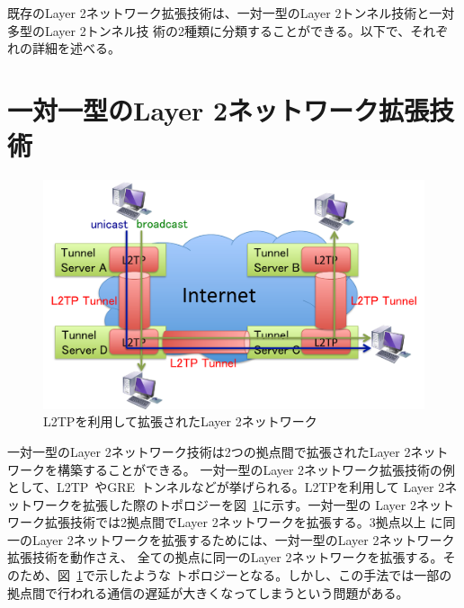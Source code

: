 既存のLayer 2ネットワーク拡張技術は、一対一型のLayer 2トンネル技術と一対多型のLayer 2トンネル技
術の2種類に分類することができる。以下で、それぞれの詳細を述べる。

\section{一対一型のLayer 2ネットワーク拡張技術}
\label{rw:pointtopoint}

\begin{figure}
	\begin{center}
		\includegraphics[scale=0.60]{./img/l2tptopology}
		\caption{L2TPを利用して拡張されたLayer 2ネットワーク}
		\label{img:l2tptopology}
	\end{center}
\end{figure}

一対一型のLayer 2ネットワーク技術は2つの拠点間で拡張されたLayer 2ネットワークを構築することができる。
一対一型のLayer 2ネットワーク拡張技術の例として、L2TP~\cite{rfc:l2tp}やGRE~\cite{rfc:gre}トンネルなどが挙げられる。L2TPを利用して
Layer 2ネットワークを拡張した際のトポロジーを図~\ref{img:l2tptopology}に示す。一対一型の
Layer 2ネットワーク拡張技術では2拠点間でLayer 2ネットワークを拡張する。3拠点以上
に同一のLayer 2ネットワークを拡張するためには、一対一型のLayer 2ネットワーク拡張技術を動作さえ、
全ての拠点に同一のLayer 2ネットワークを拡張する。そのため、図~\ref{img:l2tptopology}で示したような
トポロジーとなる。しかし、この手法では一部の拠点間で行われる通信の遅延が大きくなってしまうという問題がある。

